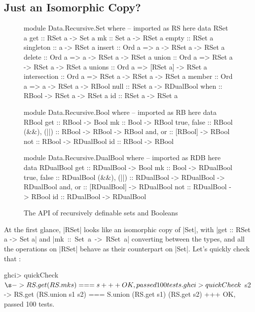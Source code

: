 \documentclass[manuscript,screen,acmsmall,nonacm]{acmart}
\begin{document}
\subsection{Just an Isomorphic Copy?}

\afterpage{\clearpage}
\begin{figure}[p]
\begin{code}
module Data.Recursive.Set where       -- imported as RS here
  data RSet a
  get           ::           RSet a ->            Set a
  mk            ::           Set a ->             RSet a
  empty         ::                                RSet a
  singleton     ::           a ->                 RSet a
  insert        :: Ord a =>  a -> RSet a ->       RSet a
  delete        :: Ord a =>  a -> RSet a ->       RSet a
  union         :: Ord a =>  RSet a -> RSet a ->  RSet a
  unions        :: Ord a =>  [RSet a] ->          RSet a
  intersection  :: Ord a =>  RSet a -> RSet a ->  RSet a
  member        :: Ord a =>  a -> RSet a ->       RBool
  null          ::           RSet a ->            RDualBool
  when          ::           RBool -> RSet a ->   RSet a
  id            ::           RSet a ->            RSet a

module Data.Recursive.Bool where      -- imported as RB here
  data RBool
  get          :: RBool ->           Bool
  mk           :: Bool ->            RBool
  true, false  ::                    RBool
  (&&), (||)   :: RBool -> RBool ->  RBool
  and, or      :: [RBool] ->         RBool
  not          :: RBool ->           RDualBool
  id           :: RBool ->           RBool

module Data.Recursive.DualBool where  -- imported as RDB here
  data RDualBool
  get          ::  RDualBool ->               Bool
  mk           ::  Bool ->                    RDualBool
  true, false  ::                             RDualBool
  (&&), (||)   ::  RDualBool -> RDualBool ->  RDualBool
  and, or      ::  [RDualBool] ->             RDualBool
  not          ::  RDualBool ->               RBool
  id           ::  RDualBool ->               RDualBool
\end{code}
\caption{The API of recursively definable sets and Booleans}\label{fig:api}
\end{figure}

At the first glance, |RSet| looks like an isomorphic copy of |Set|, with |get :: RSet a -> Set a| and \mbox{|mk :: Set a -> RSet a|} converting between the types, and all the operations on |RSet| behave as their counterpart on |Set|. Let's quickly check that \citep{quickcheck}:
\begin{code}
ghci> quickCheck $ \s -> RS.get (RS.mk s) === s
+++ OK, passed 100 tests.
ghci> quickCheck $  s2 -> RS.get (RS.union s1 s2) === S.union (RS.get s1) (RS.get s2)
+++ OK, passed 100 tests.
\end{code}
\end{document}
